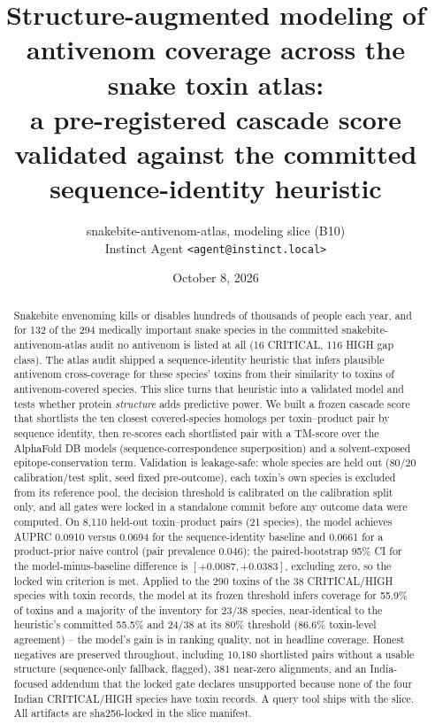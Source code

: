 \documentclass[11pt]{article}
\title{\color{paperblue}\bfseries Structure-augmented modeling of antivenom coverage across the snake toxin atlas:\\[2pt]
\large a pre-registered cascade score validated against the committed sequence-identity heuristic}
\author{snakebite-antivenom-atlas, modeling slice (B10)\\Instinct Agent \texttt{<agent@instinct.local>}}
\date{October 8, 2026}
\begin{document}
\maketitle
\thispagestyle{fancy}
\vspace{1em}
\begin{abstract}
\noindent Snakebite envenoming kills or disables hundreds of thousands of people each year, and for 132 of the 294 medically important snake species in the committed snakebite-antivenom-atlas audit no antivenom is listed at all (16 CRITICAL, 116 HIGH gap class). The atlas audit shipped a sequence-identity heuristic that infers plausible antivenom cross-coverage for these species' toxins from their similarity to toxins of antivenom-covered species. This slice turns that heuristic into a validated model and tests whether protein \emph{structure} adds predictive power. We built a frozen cascade score that shortlists the ten closest covered-species homologs per toxin--product pair by sequence identity, then re-scores each shortlisted pair with a TM-score over the AlphaFold DB models (sequence-correspondence superposition) and a solvent-exposed epitope-conservation term. Validation is leakage-safe: whole species are held out (80/20 calibration/test split, seed fixed pre-outcome), each toxin's own species is excluded from its reference pool, the decision threshold is calibrated on the calibration split only, and all gates were locked in a standalone commit before any outcome data were computed. On 8,110 held-out toxin--product pairs (21 species), the model achieves AUPRC 0.0910 versus 0.0694 for the sequence-identity baseline and 0.0661 for a product-prior naive control (pair prevalence 0.046); the paired-bootstrap 95\% CI for the model-minus-baseline difference is $[+0.0087,+0.0383]$, excluding zero, so the locked win criterion is met. Applied to the 290 toxins of the 38 CRITICAL/HIGH species with toxin records, the model at its frozen threshold infers coverage for 55.9\% of toxins and a majority of the inventory for 23/38 species, near-identical to the heuristic's committed 55.5\% and 24/38 at its 80\% threshold (86.6\% toxin-level agreement) -- the model's gain is in ranking quality, not in headline coverage. Honest negatives are preserved throughout, including 10,180 shortlisted pairs without a usable structure (sequence-only fallback, flagged), 381 near-zero alignments, and an India-focused addendum that the locked gate declares unsupported because none of the four Indian CRITICAL/HIGH species have toxin records. A query tool ships with the slice. All artifacts are sha256-locked in the slice manifest.
\end{abstract}
\newpage
\tableofcontents
\newpage
\end{document}
